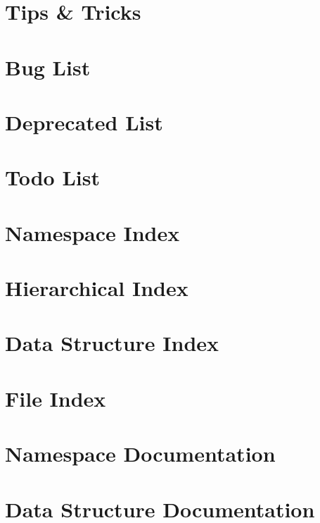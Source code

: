 \let\mypdfximage\pdfximage\def\pdfximage{\immediate\mypdfximage}\documentclass[twoside]{book}
\newcommand{\+}{\discretionary{\mbox{\scriptsize$\hookleftarrow$}}{}{}}
\begin{document}
\chapter{Tips \& Tricks}
\label{md_docs_theme_doxygen_awesome_docs_tricks}

\chapter{Bug List}
\label{bug}

\chapter{Deprecated List}
\label{deprecated}

\chapter{Todo List}
\label{todo}

\chapter{Namespace Index}

\chapter{Hierarchical Index}

\chapter{Data Structure Index}

\chapter{File Index}

\chapter{Namespace Documentation}

\chapter{Data Structure Documentation}











\end{document}
